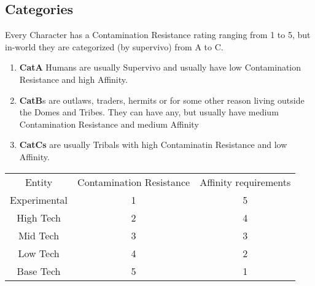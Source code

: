 \subsection{Categories}\label{subsec:categories}
Every Character has a Contamination Resistance rating ranging from 1 to 5,
but in-world they are categorized (by supervivo) from A to C\@.
\begin{enumerate}[label = - ]
\item \textbf{CatA} Humans are usually Supervivo and usually have low Contamination Resistance
                    and high Affinity.
\item \textbf{CatB}s are outlaws, traders, hermits or for some other reason living outside the Domes and Tribes.
                    They can have any, but usually have medium Contamination Resistance and medium Affinity
\item \textbf{CatCs} are usually Tribals with high Contaminatin Resistance and low Affinity.
\end{enumerate}
\begin{tabular}{c|cc}
    Entity & Contamination Resistance  & Affinity requirements\\
    Experimental & 1 & 5 \\
    High Tech & 2 & 4\\
    Mid Tech & 3 & 3 \\
    Low Tech & 4 & 2\\
    Base Tech & 5 & 1\\
\end{tabular}


